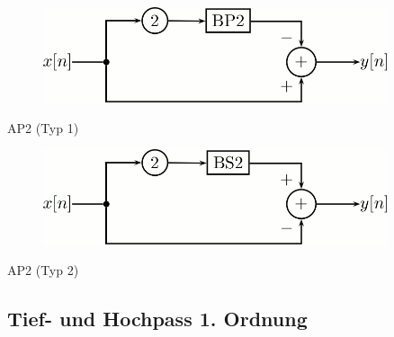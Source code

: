 \documentclass[a4paper, 12pt]{report}
\begin{document}
			\begin{minipage}[t]{0.5\textwidth}
				\begin{figure}[H]
					\centering
					\includegraphics[width=0.9\textwidth]{images/parallel_ap2_1.png}
				\end{figure}
				\begin{center}
					AP2 (Typ 1)
				\end{center}
			\end{minipage}
			\begin{minipage}[t]{0.5\textwidth}
				\begin{figure}[H]
					\centering
					\includegraphics[width=0.9\textwidth]{images/parallel_ap2_2.png}
				\end{figure}
				\begin{center}
					AP2 (Typ 2)
				\end{center}
			\end{minipage}
			
			
		\subsection*{Tief- und Hochpass 1. Ordnung}
		\vspace{-0.8cm}
			
\end{document}
